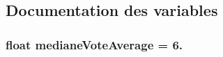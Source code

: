 \subsection{Documentation des variables}
\hypertarget{namespaceoperatorBDD_a131e5e7a22125521cf2cb5eb732a0f54}{
\subsubsection[{mediane\-Vote\-Average}]{\setlength{\rightskip}{0pt plus 5cm}float mediane\-Vote\-Average = 6.}}\label{namespaceoperatorBDD_a131e5e7a22125521cf2cb5eb732a0f54}
